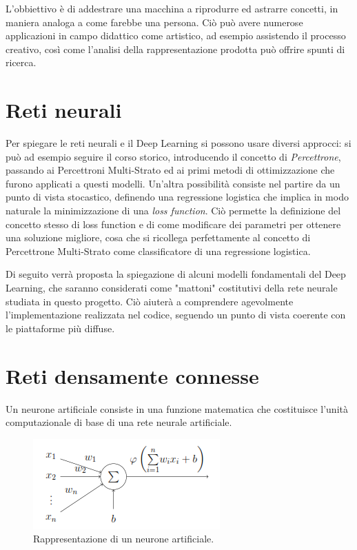 L'obbiettivo è di addestrare una macchina a riprodurre ed astrarre concetti, in maniera analoga a come farebbe una persona. Ciò può avere numerose applicazioni in campo didattico come artistico, ad esempio assistendo il processo creativo, così come l'analisi della rappresentazione prodotta può offrire spunti di ricerca.
\section{Reti neurali}
Per spiegare le reti neurali e il Deep Learning si possono usare diversi approcci: si può ad esempio seguire il corso storico, introducendo il concetto di \textit{Percettrone}, passando ai Percettroni Multi-Strato ed ai primi metodi di ottimizzazione che furono applicati a questi modelli. Un'altra possibilità consiste nel partire da un punto di vista stocastico, definendo una regressione logistica che implica in modo naturale la minimizzazione di una \textit{loss function}. Ciò permette la definizione del concetto stesso di loss function e di come modificare dei parametri per ottenere una soluzione migliore, cosa che si ricollega perfettamente al concetto di Percettrone Multi-Strato come classificatore di una regressione logistica.

Di seguito verrà proposta la spiegazione di alcuni modelli fondamentali del Deep Learning, che saranno considerati come "mattoni" costitutivi della rete neurale studiata in questo progetto. Ciò aiuterà a comprendere agevolmente l'implementazione realizzata nel codice, seguendo un punto di vista coerente con le piattaforme più diffuse.
\section{Reti densamente connesse} %
\label{sec:reti_densamente_connesse}
Un neurone artificiale consiste in una funzione matematica che costituisce l'unità computazionale di base di una rete neurale artificiale.
\begin{figure}[ht]
	\centering
	\includegraphics{img/artificial_neuron.PNG}
	\caption{Rappresentazione di un neurone artificiale.}
	\label{fig:1.2}
\end{figure}

